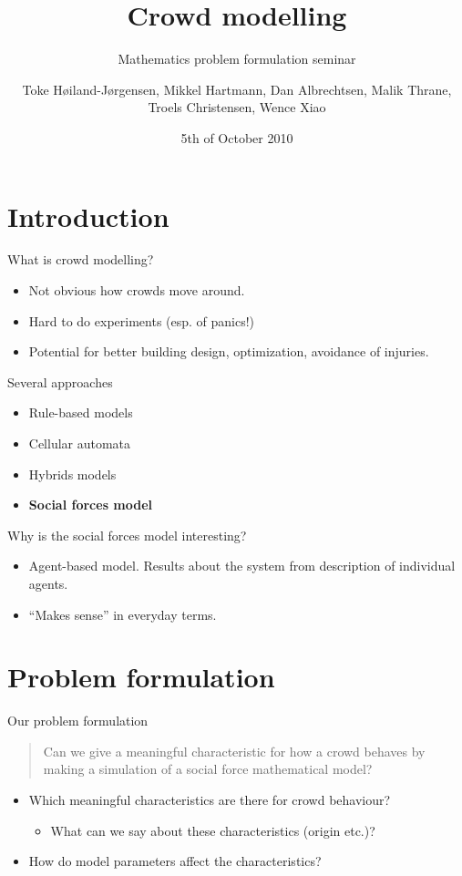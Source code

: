 \documentclass{beamer}
\title{Crowd modelling}
\subtitle
{Mathematics problem formulation seminar} %
\author{Toke Høiland-Jørgensen, Mikkel Hartmann, Dan Albrechtsen, Malik 
Thrane, Troels Christensen, Wence Xiao}
\date{5th of October 2010}
\begin{document}
\begin{frame}
  \titlepage
\end{frame}


\section{Introduction}
\begin{frame}{What is crowd modelling?}
    \begin{itemize}
        \item Not obvious how crowds move around.
        \item Hard to do experiments (esp. of panics!)
        \item Potential for better building design, optimization, avoidance of 
            injuries.
    \end{itemize}
\end{frame}

\begin{frame}{Several approaches}
    \begin{itemize}
        \item Rule-based models
        \item Cellular automata
        \item Hybrids models
        \item \textbf{Social forces model}
    \end{itemize}
\end{frame}

\begin{frame}{Why is the social forces model interesting?}
    \begin{itemize}
        \item Agent-based model. Results about the system from description of 
            individual agents.
        \item ``Makes sense'' in everyday terms.
    \end{itemize}
\end{frame}

\section{Problem formulation}
\begin{frame}{Our problem formulation}
    \begin{quote}
        Can we give a meaningful characteristic for how a crowd behaves by 
        making a simulation of a social force mathematical model?
    \end{quote}
    \begin{itemize}
        \item Which meaningful characteristics are there for crowd behaviour?
            \begin{itemize}
                \item What can we say about these characteristics (origin 
                    etc.)?
            \end{itemize}
        \item How do model parameters affect the characteristics?
    \end{itemize}
\end{frame}
\end{document}
